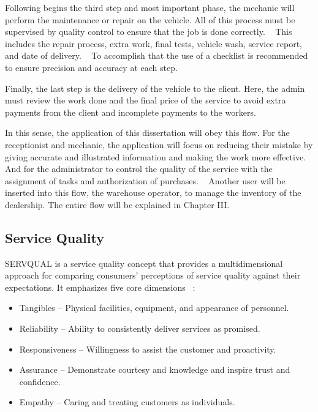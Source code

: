 Following begins the third step and most important phase, the mechanic will perform the maintenance or repair on the vehicle. 
All of this process must be supervised by quality control to ensure that the job is done correctly. ~\cite{Setting_the_after_sale_process}
This includes the repair process, extra work, final tests, vehicle wash, service report, and date of delivery. ~\cite{Setting_the_after_sale_process}
To accomplish that the use of a checklist is recommended to ensure precision and accuracy at each step. ~\cite{Setting_the_after_sale_process}

Finally, the last step is the delivery of the vehicle to the client. 
Here, the admin must review the work done and the final price of the service to avoid extra payments from the client and incomplete payments to the workers. ~\cite{Setting_the_after_sale_process}

In this sense, the application of this dissertation will obey this flow.
For the receptionist and mechanic, the application will focus on reducing their mistake by giving accurate and illustrated information and making the work more effective.
And for the administrator to control the quality of the service with the assignment of tasks and authorization of purchases.  
Another user will be inserted into this flow, the warehouse operator, to manage the inventory of the dealership. 
The entire flow will be explained in Chapter III. 

\subsection{Service Quality}
SERVQUAL is a service quality concept that provides a multidimensional approach for comparing consumers' perceptions of service quality against their expectations. 
It emphasizes five core dimensions ~\cite{SERVQUAL_OLD}:


\begin{itemize}
   \item Tangibles – Physical facilities, equipment, and appearance of personnel.
   \item Reliability – Ability to consistently deliver services as promised.
   \item Responsiveness – Willingness to assist the customer and proactivity.
   \item Assurance – Demonstrate courtesy and knowledge and inspire trust and confidence.
   \item Empathy – Caring and treating customers as individuals.
  \end{itemize}

